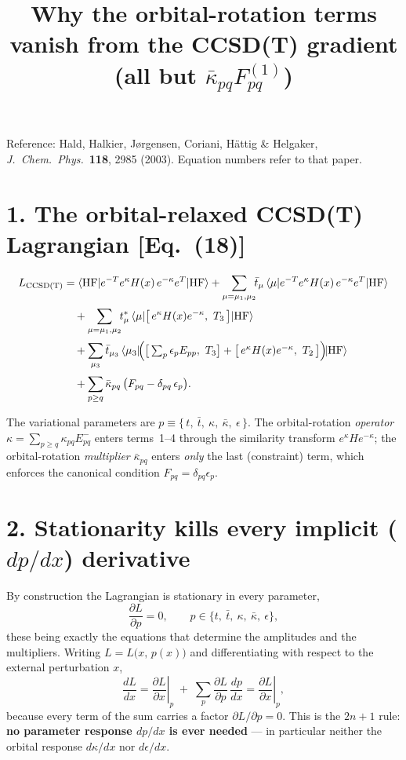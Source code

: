 \documentclass[11pt]{article}
\title{Why the orbital-rotation terms vanish from the CCSD(T) gradient\\[2pt]
       \large (all but $\bar\kappa_{pq}F^{(1)}_{pq}$)}
\author{}
\date{}
\newcommand{\bra}[1]{\langle #1|}
\newcommand{\ket}[1]{|#1\rangle}
\newcommand{\HF}{\mathrm{HF}}
\newcommand{\pdx}[1]{\left.\frac{\partial #1}{\partial x}\right|_{p}}
\begin{document}
\maketitle

\noindent
Reference: Hald, Halkier, J\o rgensen, Coriani, H\"attig \& Helgaker,
\emph{J.\ Chem.\ Phys.}\ \textbf{118}, 2985 (2003). Equation numbers refer to that paper.

\section*{1. The orbital-relaxed CCSD(T) Lagrangian [Eq.~(18)]}

\begin{align}
L_{\mathrm{CCSD(T)}}
&= \bra{\HF} e^{-T} e^{\kappa} H(x)\, e^{-\kappa} e^{T}\ket{\HF}
 + \sum_{\mu=\mu_1,\mu_2}\!\! \bar t_\mu\, \bra{\mu} e^{-T} e^{\kappa} H(x)\, e^{-\kappa} e^{T}\ket{\HF}
 \notag\\[2pt]
&\quad + \sum_{\mu=\mu_1,\mu_2}\!\! t^{*}_\mu\, \bra{\mu}\big[\, e^{\kappa}H(x)e^{-\kappa},\ T_3\,\big]\ket{\HF}
 \notag\\[2pt]
&\quad + \sum_{\mu_3} \bar t_{\mu_3}\, \bra{\mu_3}\!\Big(\big[\textstyle\sum_p \epsilon_p E_{pp},\ T_3\big]
        + \big[\, e^{\kappa}H(x)e^{-\kappa},\ T_2\,\big]\Big)\!\ket{\HF}
 \notag\\[2pt]
&\quad + \sum_{p\ge q} \bar\kappa_{pq}\,\big(F_{pq} - \delta_{pq}\,\epsilon_p\big).
\label{eq:L}
\end{align}

The variational parameters are $p \equiv \{\,t,\ \bar t,\ \kappa,\ \bar\kappa,\ \epsilon\,\}$.
The orbital-rotation \emph{operator} $\kappa=\sum_{p\ge q}\kappa_{pq}E^-_{pq}$ enters terms~1--4
through the similarity transform $e^{\kappa}H e^{-\kappa}$; the orbital-rotation \emph{multiplier}
$\bar\kappa_{pq}$ enters \emph{only} the last (constraint) term, which enforces the canonical
condition $F_{pq}=\delta_{pq}\epsilon_p$.

\section*{2. Stationarity kills every implicit ($dp/dx$) derivative}

By construction the Lagrangian is stationary in every parameter,
\begin{equation}
\frac{\partial L}{\partial p} = 0,\qquad p \in \{t,\ \bar t,\ \kappa,\ \bar\kappa,\ \epsilon\},
\end{equation}
these being exactly the equations that determine the amplitudes and the multipliers.
Writing $L=L\big(x,\,p(x)\big)$ and differentiating with respect to the external perturbation $x$,
\begin{equation}
\frac{dL}{dx}
 = \pdx{L} \;+\; \sum_{p}\frac{\partial L}{\partial p}\,\frac{dp}{dx}
 = \pdx{L},
\label{eq:2n1}
\end{equation}
because every term of the sum carries a factor $\partial L/\partial p = 0$. This is the
$2n{+}1$ rule: \textbf{no parameter response $dp/dx$ is ever needed} --- in particular neither the
orbital response $d\kappa/dx$ nor $d\epsilon/dx$.
\end{document}

